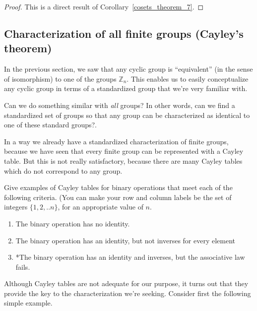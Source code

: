 \begin{proof}
This  is a direct result of Corollary~\ref{cosets_theorem_7}.
\end{proof}
 
\medskip

\subsection{Characterization of all finite groups (Cayley's theorem) }
 
In the previous section, we saw that any cyclic group is ``equivalent'' (in the sense of isomorphism) to one of the groups $\mathbb{Z}_n$.  This enables us to easily conceptualize any cyclic group in terms of a standardized group that we're very familiar with. 

Can we do something similar with \emph{all} 
groups? In other words, can we find  a standardized set of groups so that any group can be characterized as identical to one of these standard groups?. 

In a way we already have a standardized characterization of finite groups, because we have seen that every finite group can be represented with a Cayley table.  But this is not really satisfactory, because there are many Cayley tables which do not correspond to any group.

\begin{exercise}\label{exercise:isomorph:CayleyNotGroup}
Give examples of Cayley tables for binary operations that meet each of the following criteria.  (You can make your row and column labels be the set of integers $\{1,2,..n\}$, for an appropriate value of $n$.
\begin{enumerate}
\item
The binary operation has no identity.
\item
The binary operation has an identity, but not inverses for every element
\item
*The binary operation has an identity and inverses, but  the associative law fails.
\end{enumerate}
\end{exercise} 

Although Cayley tables are not adequate for our purpose, it turns out that they provide the key to the characterization we're seeking. Consider first the following simple example.

